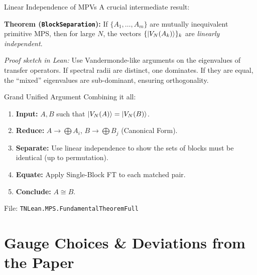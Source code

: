 \documentclass[aspectratio=169,10pt]{beamer}
\begin{document}
\begin{frame}{Linear Independence of MPVs}
    A crucial intermediate result:
    
    \textbf{Theorem (\texttt{BlockSeparation}):}
    If $\{A_1, \dots, A_m\}$ are mutually inequivalent primitive MPS, then for large $N$, the vectors $\{\ket{V_N(A_k)}\}_k$ are \emph{linearly independent}.

    \vspace{0.5em}
    \emph{Proof sketch in Lean:}
    Use Vandermonde-like arguments on the eigenvalues of transfer operators. If spectral radii are distinct, one dominates. If they are equal, the ``mixed'' eigenvalues are sub-dominant, ensuring orthogonality.
\end{frame}

\begin{frame}{Grand Unified Argument}
    \small
    Combining it all:
    
    \begin{enumerate}
        \item \textbf{Input:} $A, B$ such that $\ket{V_N(A)} = \ket{V_N(B)}$.
        \item \textbf{Reduce:} $A \to \bigoplus A_i$, $B \to \bigoplus B_j$ (Canonical Form).
        \item \textbf{Separate:} Use linear independence to show the sets of blocks must be identical (up to permutation).
        \item \textbf{Equate:} Apply Single-Block FT to each matched pair.
        \item \textbf{Conclude:} $A \cong B$.
    \end{enumerate}
    
    File: \texttt{TNLean.MPS.FundamentalTheoremFull}
\end{frame}

\section{Gauge Choices \& Deviations from the Paper}
\end{document}
